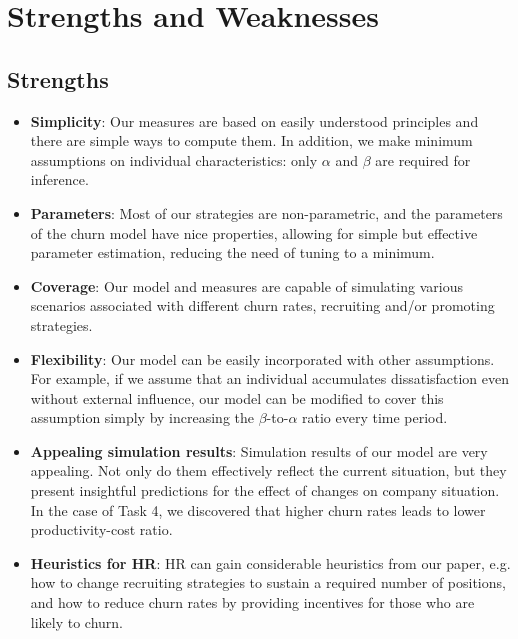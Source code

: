 \documentclass[tcn = 37075, sheet = false, abstract = false]{mcmthesis}
\begin{document}
	\section{Strengths and Weaknesses}
	
	\subsection{Strengths}
	\begin{itemize}
		\item \textbf{Simplicity}: Our measures are based on easily understood principles and there are simple ways to compute them. In addition, we make minimum assumptions on individual characteristics: only $\alpha$ and $\beta$ are required for inference. 
		\item \textbf{Parameters}: Most of our strategies are non-parametric, and the parameters of the churn model have nice properties, allowing for simple but effective parameter estimation, reducing the need of tuning to a minimum.
		\item \textbf{Coverage}: Our model and measures are capable of simulating various scenarios associated with different churn rates, recruiting and/or promoting strategies.
		\item \textbf{Flexibility}: Our model can be easily incorporated with other assumptions. For example, if we assume that an individual accumulates dissatisfaction even without external influence, our model can be modified to cover this assumption simply by increasing the $\beta$-to-$\alpha$ ratio every time period.
		\item \textbf{Appealing simulation results}: Simulation results of our model are very appealing. Not only do them effectively reflect the current situation, but they present insightful predictions for the effect of changes on company situation. In the case of Task 4, we discovered that higher churn rates leads to lower productivity-cost ratio. 
		\item \textbf{Heuristics for HR}: HR can gain considerable heuristics from our paper, e.g. how to change recruiting strategies to sustain a required number of positions, and how to reduce churn rates by providing incentives for those who are likely to churn.
		
	\end{itemize}
	
\end{document}
